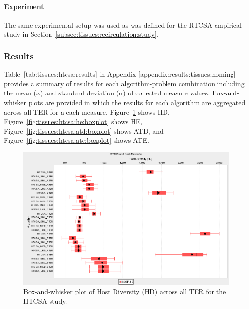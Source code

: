 %
%
\paragraph{Experiment}
The same experimental setup was used as was defined for the RTCSA empirical study in Section~\ref{subsec:tissues:recirculation:study}.

%
%
\subsubsection{Results}
Table~\ref{tab:tissues:htcsa:results} in Appendix \ref{appendix:results:tissues:homing} provides a summary of results for each algorithm-problem combination including the mean ($\bar{x}$) and standard deviation ($\sigma$) of collected measure values. Box-and-whisker plots are provided in which the results for each algorithm are aggregated across all TER for a each measure. Figure~\ref{fig:tissues:htcsa:hd:boxplot} shows HD, Figure~\ref{fig:tissues:htcsa:he:boxplot} shows HE, Figure~\ref{fig:tissues:htcsa:atd:boxplot} shows ATD, and Figure~\ref{fig:tissues:htcsa:ate:boxplot} shows ATE.

\begin{figure}[htp]
	\centering
		\includegraphics[scale=0.70]{Tissues/HTCSA-HD}
	\caption{Box-and-whisker plot of Host Diversity (HD) across all TER for the HTCSA study.}
	\label{fig:tissues:htcsa:hd:boxplot}
\end{figure}

